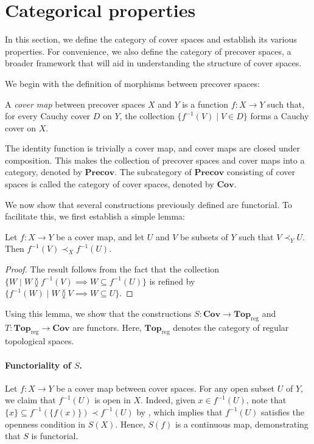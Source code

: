\documentclass[pdflatex,sn-mathphys-num]{sn-jnl}
\theoremstyle{definition}
\theoremstyle{remark}
\numberwithin{figure}{section}
\newcommand{\overlap}[2]{#1 \between #2}
\newcommand{\rb}{\prec}
\newcommand{\cat}[1]{\mathbf{#1}}
\begin{document}
\section{Categorical properties}
\label{sec:cat}

In this section, we define the category of cover spaces and establish its various properties.
For convenience, we also define the category of precover spaces, a broader framework that will aid in understanding the structure of cover spaces.

We begin with the definition of morphisms between precover spaces:

\begin{defn}
A \emph{cover map} between precover spaces $X$ and $Y$ is a function $f : X \to Y$ such that, for every Cauchy cover $D$ on $Y$, the collection $\{ f^{-1}(V) \mid V \in D \}$ forms a Cauchy cover on $X$.
\end{defn}

The identity function is trivially a cover map, and cover maps are closed under composition.
This makes the collection of precover spaces and cover maps into a category, denoted by $\cat{Precov}$.
The subcategory of $\cat{Precov}$ consisting of cover spaces is called the category of cover spaces, denoted by $\cat{Cov}$.

We now show that several constructions previously defined are functorial.
To facilitate this, we first establish a simple lemma:

\begin{lem}
Let $f : X \to Y$ be a cover map, and let $U$ and $V$ be subsets of $Y$ such that $V \rb_Y U$.
Then $f^{-1}(V) \rb_X f^{-1}(U)$.
\end{lem}
\begin{proof}
The result follows from the fact that the collection $\{ W \mid \overlap{W}{f^{-1}(V)} \implies W \subseteq f^{-1}(U) \}$ is refined by $\{ f^{-1}(W) \mid \overlap{W}{V} \implies W \subseteq U \}$.
\end{proof}

Using this lemma, we show that the constructions $S : \cat{Cov} \to \cat{Top}_\mathrm{reg}$ and $T : \cat{Top}_\mathrm{reg} \to \cat{Cov}$ are functors.
Here, $\cat{Top}_\mathrm{reg}$ denotes the category of regular topological spaces.

\paragraph{Functoriality of $S$.}
Let $f : X \to Y$ be a cover map between cover spaces.
For any open subset $U$ of $Y$, we claim that $f^{-1}(U)$ is open in $X$.
Indeed, given $x \in f^{-1}(U)$, note that $\{x\} \subseteq f^{-1}(\{f(x)\}) \rb f^{-1}(U)$ by ,
which implies that $f^{-1}(U)$ satisfies the openness condition in $S(X)$.
Hence, $S(f)$ is a continuous map, demonstrating that $S$ is functorial.
\end{document}
